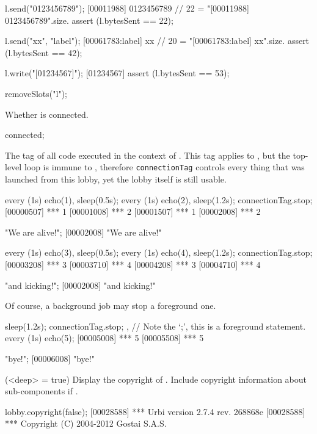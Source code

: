 \begin{urbiscriptapi}
\begin{urbiscript}
l.send("0123456789");
[00011988] 0123456789
// 22 = "[00011988] 0123456789\n".size.
assert (l.bytesSent == 22);

l.send("xx", "label");
[00061783:label] xx
// 20 = "[00061783:label] xx\n".size.
assert (l.bytesSent == 42);

l.write("[01234567]\n");
[01234567]
assert (l.bytesSent == 53);
\end{urbiscript}
\begin{urbicomment}
removeSlots("l");
\end{urbicomment}


\item[connected]
  Whether \this is connected.
\begin{urbiassert}
connected;
\end{urbiassert}


\item[connectionTag] The tag of all code executed in the context of \this.
  This tag applies to \this, but the top-level loop is immune to
  , therefore \lstinline|connectionTag| controls every
  thing that was launched from this lobby, yet the lobby itself is still
  usable.
\begin{urbiscript}
every (1s) echo(1), sleep(0.5s); every (1s) echo(2),
sleep(1.2s);
connectionTag.stop;
[00000507] *** 1
[00001008] *** 2
[00001507] *** 1
[00002008] *** 2

"We are alive!";
[00002008] "We are alive!"

every (1s) echo(3), sleep(0.5s); every (1s) echo(4),
sleep(1.2s);
connectionTag.stop;
[00003208] *** 3
[00003710] *** 4
[00004208] *** 3
[00004710] *** 4

"and kicking!";
[00002008] "and kicking!"
\end{urbiscript}

  Of course, a background job may stop a foreground one.
\begin{urbiscript}
{ sleep(1.2s); connectionTag.stop; },
// Note the `;', this is a foreground statement.
every (1s) echo(5);
[00005008] *** 5
[00005508] *** 5

"bye!";
[00006008] "bye!"
\end{urbiscript}


\item[copyright](<deep> = true)%
  Display the copyright of \usdk.  Include copyright information
  about sub-components if .
\begin{urbiscript}
lobby.copyright(false);
[00028588] *** Urbi version 2.7.4 rev. 268868e
[00028588] *** Copyright (C) 2004-2012 Gostai S.A.S.


\end{urbiscript}
\end{urbiscriptapi}
